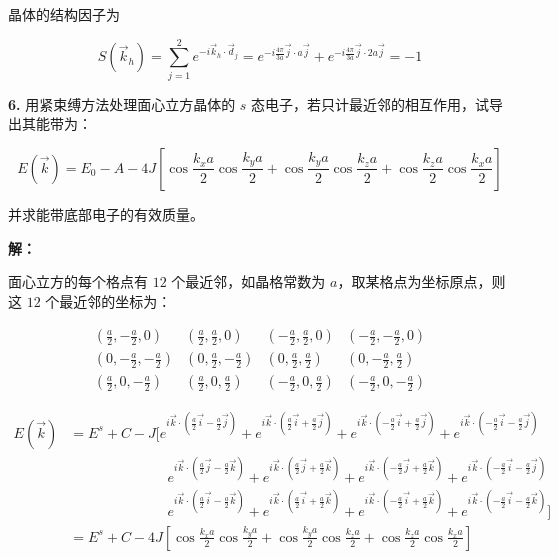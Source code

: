 晶体的结构因子为

\begin{equation*}
    S(\vec{k}_h) = \sum_{j=1}^{2} e^{-i \vec{k}_h \cdot \vec{d}_j} = e^{-i \frac{4\pi}{3a}\vec{j} \cdot a\vec{j}} + e^{-i \frac{4\pi}{3a}\vec{j} \cdot 2a\vec{j}} = -1
\end{equation*}

\noindent \textbf{6.\quad} 用紧束缚方法处理面心立方晶体的 $s$ 态电子，若只计最近邻的相互作用，试导出其能带为：

\begin{equation*}
    E(\vec{k}) = E_0 - A - 4J \left[\cos{\frac{k_x a}{2}}\cos{\frac{k_y a}{2}} + \cos{\frac{k_y a}{2}}\cos{\frac{k_z a}{2}} + \cos{\frac{k_z a}{2}}\cos{\frac{k_x a}{2}}\right]
\end{equation*}

并求能带底部电子的有效质量。

\noindent \textbf{解：}

面心立方的每个格点有 $12$ 个最近邻，如晶格常数为 $a$，取某格点为坐标原点，则这 $12$ 个最近邻的坐标为：

\begin{equation*}
    \begin{matrix}
        (\frac{a}{2}, -\frac{a}{2}, 0) & (\frac{a}{2}, \frac{a}{2}, 0) & (-\frac{a}{2}, \frac{a}{2}, 0) & (-\frac{a}{2}, -\frac{a}{2}, 0) \\
        (0, -\frac{a}{2}, -\frac{a}{2}) & (0, \frac{a}{2}, -\frac{a}{2}) & (0, \frac{a}{2}, \frac{a}{2}) & (0, -\frac{a}{2}, \frac{a}{2}) \\
        (\frac{a}{2}, 0, -\frac{a}{2}) & (\frac{a}{2}, 0, \frac{a}{2}) & (-\frac{a}{2}, 0, \frac{a}{2}) & (-\frac{a}{2}, 0, -\frac{a}{2})
    \end{matrix}
\end{equation*}

\begin{align*}
    E(\vec{k}) &= E^s + C - J \bigg[e^{i\vec{k}\cdot\left(\frac{a}{2}\vec{i}-\frac{a}{2}\vec{j}\right)} + e^{i\vec{k}\cdot\left(\frac{a}{2}\vec{i}+\frac{a}{2}\vec{j}\right)} + e^{i\vec{k}\cdot\left(-\frac{a}{2}\vec{i}+\frac{a}{2}\vec{j}\right)} + e^{i\vec{k}\cdot\left(-\frac{a}{2}\vec{i}-\frac{a}{2}\vec{j}\right)} \\
    &\quad\quad\quad\quad\quad\quad\quad e^{i\vec{k}\cdot\left(\frac{a}{2}\vec{j}-\frac{a}{2}\vec{k}\right)} + e^{i\vec{k}\cdot\left(\frac{a}{2}\vec{j}+\frac{a}{2}\vec{k}\right)} + e^{i\vec{k}\cdot\left(-\frac{a}{2}\vec{j}+\frac{a}{2}\vec{k}\right)} + e^{i\vec{k}\cdot\left(-\frac{a}{2}\vec{i}-\frac{a}{2}\vec{j}\right)} \\
    &\quad\quad\quad\quad\quad\quad\quad e^{i\vec{k}\cdot\left(\frac{a}{2}\vec{i}-\frac{a}{2}\vec{k}\right)} + e^{i\vec{k}\cdot\left(\frac{a}{2}\vec{i}+\frac{a}{2}\vec{k}\right)} + e^{i\vec{k}\cdot\left(-\frac{a}{2}\vec{i}+\frac{a}{2}\vec{k}\right)} + e^{i\vec{k}\cdot\left(-\frac{a}{2}\vec{i}-\frac{a}{2}\vec{k}\right)}\bigg] \\
    &= E^s + C - 4J \left[\cos{\frac{k_x a}{2}}\cos{\frac{k_y a}{2}} + \cos{\frac{k_y a}{2}}\cos{\frac{k_z a}{2}} + \cos{\frac{k_z a}{2}}\cos{\frac{k_x a}{2}}\right]
\end{align*}

